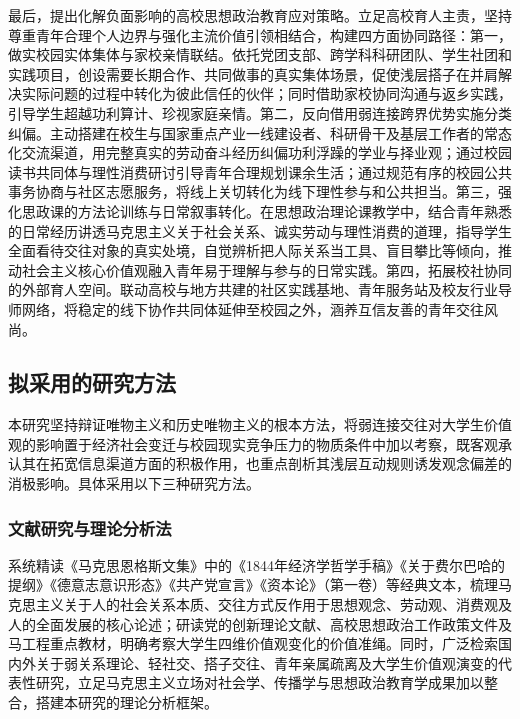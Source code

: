 最后，提出化解负面影响的高校思想政治教育应对策略。立足高校育人主责，坚持尊重青年合理个人边界与强化主流价值引领相结合，构建四方面协同路径：第一，做实校园实体集体与家校亲情联结。依托党团支部、跨学科科研团队、学生社团和实践项目，创设需要长期合作、共同做事的真实集体场景，促使浅层搭子在并肩解决实际问题的过程中转化为彼此信任的伙伴；同时借助家校协同沟通与返乡实践，引导学生超越功利算计、珍视家庭亲情。第二，反向借用弱连接跨界优势实施分类纠偏。主动搭建在校生与国家重点产业一线建设者、科研骨干及基层工作者的常态化交流渠道，用完整真实的劳动奋斗经历纠偏功利浮躁的学业与择业观；通过校园读书共同体与理性消费研讨引导青年合理规划课余生活；通过规范有序的校园公共事务协商与社区志愿服务，将线上关切转化为线下理性参与和公共担当。第三，强化思政课的方法论训练与日常叙事转化。在思想政治理论课教学中，结合青年熟悉的日常经历讲透马克思主义关于社会关系、诚实劳动与理性消费的道理，指导学生全面看待交往对象的真实处境，自觉辨析把人际关系当工具、盲目攀比等倾向，推动社会主义核心价值观融入青年易于理解与参与的日常实践。第四，拓展校社协同的外部育人空间。联动高校与地方共建的社区实践基地、青年服务站及校友行业导师网络，将稳定的线下协作共同体延伸至校园之外，涵养互信友善的青年交往风尚。


\subsection{拟采用的研究方法}

本研究坚持辩证唯物主义和历史唯物主义的根本方法，将弱连接交往对大学生价值观的影响置于经济社会变迁与校园现实竞争压力的物质条件中加以考察，既客观承认其在拓宽信息渠道方面的积极作用，也重点剖析其浅层互动规则诱发观念偏差的消极影响。具体采用以下三种研究方法。

\subsubsection{文献研究与理论分析法}

系统精读《马克思恩格斯文集》中的《1844年经济学哲学手稿》《关于费尔巴哈的提纲》《德意志意识形态》《共产党宣言》《资本论》（第一卷）等经典文本，梳理马克思主义关于人的社会关系本质、交往方式反作用于思想观念、劳动观、消费观及人的全面发展的核心论述；研读党的创新理论文献、高校思想政治工作政策文件及马工程重点教材，明确考察大学生四维价值观变化的价值准绳。同时，广泛检索国内外关于弱关系理论、轻社交、搭子交往、青年亲属疏离及大学生价值观演变的代表性研究，立足马克思主义立场对社会学、传播学与思想政治教育学成果加以整合，搭建本研究的理论分析框架。

